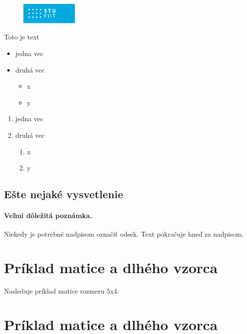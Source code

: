 \documentclass[10pt,twocolumn,twoside,slovak,a4paper]{article}
\begin{document}
\begin{figure}  %
    \vspace{-10pt}  
    \includegraphics[width=0.25\textwidth]{logo_fiit.png}
    \vspace{-10pt}  
\end{figure}

Toto je text

\begin{itemize}
\item jedna vec
\item druhá vec
	\begin{itemize}
	\item x
	\item y
	\end{itemize}
\end{itemize}


\begin{enumerate}
\item jedna vec
\item druhá vec
	\begin{enumerate}
	\item x
	\item y
	\end{enumerate}
\end{enumerate}


\subsection{Ešte nejaké vysvetlenie} \label{ina:este}

\paragraph{Veľmi dôležitá poznámka.}
Niekedy je potrebné nadpisom označiť odsek. Text pokračuje hneď za nadpisom.

\section{Príklad matice a dlhého vzorca}

Nasleduje príklad matice rozmeru 5x4:

\section{Príklad matice a dlhého vzorca}
\end{document}
